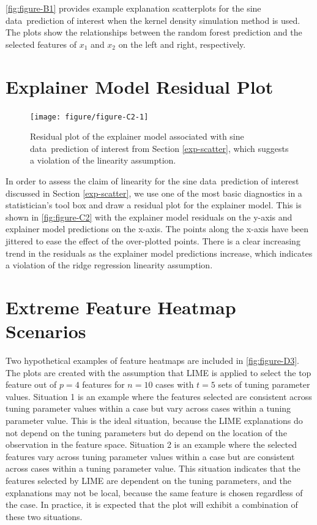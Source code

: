 \documentclass[AMS,STIX2COL]{WileyNJD-v2}\usepackage[]{graphicx}\usepackage[]{color}
\newenvironment{knitrout}{}{} %
\newcommand{\data}{sine data}
\begin{document}
\autoref{fig:figure-B1} provides example explanation scatterplots for the \data \ prediction of interest when the kernel density simulation method is used. The plots show the relationships between the random forest prediction and the selected features of $x_1$ and $x_2$ on the left and right, respectively.  

\section{Explainer Model Residual Plot} \label{residual-plot}
\begin{figure}[!b]
\begin{knitrout}
\color{fgcolor}

{\centering \texttt{[image: figure/figure-C2-1]} 

}



\end{knitrout}
\caption{Residual plot of the explainer model associated with \data \ prediction of interest from Section \ref{exp-scatter}, which suggests a violation of the linearity assumption.}
\label{fig:figure-C2}
\end{figure}

In order to assess the claim of linearity for the \data \ prediction of interest discussed in Section \ref{exp-scatter}, we use one of the most basic diagnostics in a statistician's tool box and draw a residual plot for the explainer model. This is shown in \autoref{fig:figure-C2} with the explainer model residuals on the y-axis and explainer model predictions on the x-axis. The points along the x-axis have been jittered to ease the effect of the over-plotted points. There is a clear increasing trend in the residuals as the explainer model predictions increase, which indicates a violation of the ridge regression linearity assumption.

\section{Extreme Feature Heatmap Scenarios} \label{feat-heat-ex}

Two hypothetical examples of feature heatmaps are included in \autoref{fig:figure-D3}. The plots are created with the assumption that LIME is applied to select the top feature out of $p=4$  features for $n=10$ cases with $t=5$ sets of tuning parameter values. Situation 1 is an example where the features selected are consistent across tuning parameter values within a case but vary across cases within a tuning parameter value. This is the ideal situation, because the LIME explanations do not depend on the tuning parameters but do depend on the location of the observation in the feature space. Situation 2 is an example where the selected features vary across tuning parameter values within a case but are consistent across cases within a tuning parameter value. This situation indicates that the features selected by LIME are dependent on the tuning parameters, and the explanations may not be  local, because the same feature is chosen regardless of the case. In practice, it is expected that the plot will exhibit a combination of these two situations.
\end{document}
